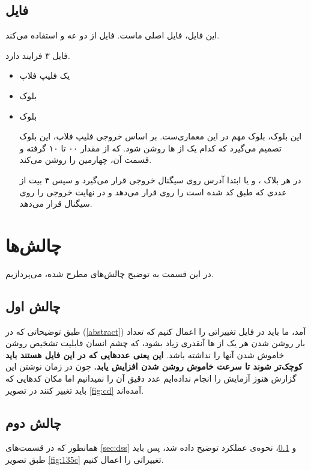 \documentclass[dvipsnames, svgnames, x11names, a4paper, 11pt]{article}
\begin{document}
\subsection{فایل }\label{sec:ss}
این فایل، فایل اصلی ماست. فایل از دو 
عه 
و
استفاده می‌کند.

فایل ۳ فرایند دارد.
\begin{itemize}
\item 
یک فلیپ فلاپ 
\item 
بلوک 
\item 
بلوک 

این بلوک، بلوک مهم در این معماری‌ست.
بر اساس خروجی فلیپ فلاپ، این بلوک تصمیم می‌گیرد که کدام یک از ها روشن شود. که از مقدار ۰۰ تا ۱۰ گرفته و قسمت  آن، چهارمین  را روشن می‌کند.

در هر بلاک ،  و یا  ابتدا آدرس  روی سیگنال خروجی  قرار می‌گیرد و سپس ۴ بیت از عددی که طبق 
کد شده است را روی 
قرار می‌دهد و در نهایت خروجی 
را روی سیگنال 
قرار می‌دهد.
\end{itemize}



\section{چالش‌ها}
در این قسمت به توضیح چالش‌های مطرح شده، می‌پردازیم.

\subsection{چالش اول}
طبق توضیحاتی که در 
(\ref{abstract})
آمد، ما باید در فایل 
تغییراتی را اعمال کنیم که تعداد بار روشن شدن هر یک از 
ها
آنقدری زیاد بشود، که چشم انسان قابلیت تشخیص روشن خاموش شدن آنها را نداشته باشد.
\textbf{این یعنی عدد‌هایی که در این فایل‌ هستند باید کوچک‌تر شوند تا سرعت خاموش روشن شدن افزایش یابد.}
چون در زمان نوشتن این گزارش هنوز آزمایش را انجام نداده‌ایم عدد دقیق آن را نمیدانیم اما مکان‌ کد‌هایی که باید تغییر کنند در تصویر
\ref{fig:cd}
آمده‌اند.
\subsection{چالش دوم}\label{subsec:sec-chal}
همانطور که در قسمت‌های
\ref{sec:dss}
و
\ref{sec:ss}،
نحوه‌ی عملکرد توضیح داده شد، پس باید طبق تصویر 
\ref{fig:135c}
تغییراتی را اعمال کنیم. 
\end{document}
